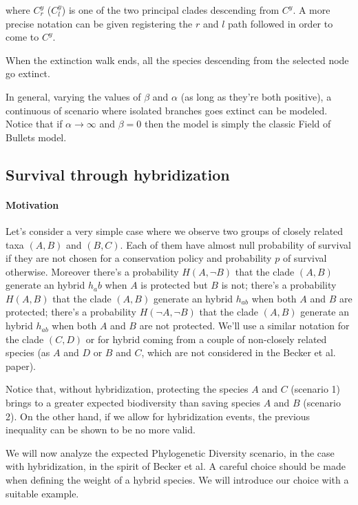 \documentclass[12pt,a4paper]{report}
\begin{document}
where $C^y_r$ ($C^y_l$) is one of the two principal clades descending from $C^y$. A more precise notation can be given registering the $r$ and $l$ path followed in order to come to $C^y$.

When the extinction walk ends, all the species descending from the selected node go extinct.

In general, varying the values of $\beta$ and $\alpha$ (as long as they're both positive), a continuous of scenario where isolated branches goes extinct can be modeled. Notice that if $\alpha \to \infty$ and $\beta = 0$ then the model is simply the classic Field of Bullets model.

\subsection*{Survival through hybridization}

\paragraph{Motivation}

Let's consider a very simple case where we observe two groups of closely related taxa $(A,B)$ and $(B,C)$. Each of them have almost null probability of survival if they are not chosen for a conservation policy and probability $p$ of survival otherwise. Moreover there's a probability $H(A,\neg B)$ that the clade $(A,B)$ generate an hybrid $h_ab$ when $A$ is protected but $B$ is not; there's a probability $H(A,B)$ that the clade $(A,B)$ generate an hybrid $h_{ab}$ when both $A$ and $B$ are protected; there's a probability $H(\neg A, \neg B)$ that the clade $(A,B)$ generate an hybrid $h_{ab}$ when both $A$ and $B$ are not protected. We'll use a similar notation for the clade $(C,D)$ or for hybrid coming from a couple of non-closely related species (as $A$ and $D$ or $B$ and $C$, which are not considered in the Becker et al. paper).

Notice that, without hybridization, protecting the species $A$ and $C$ (scenario 1) brings to a greater expected biodiversity than saving species $A$ and $B$ (scenario 2). On the other hand, if we allow for hybridization events, the previous inequality can be shown to be no more valid.

We will now analyze the expected Phylogenetic Diversity scenario, in the case with hybridization, in the spirit of Becker et al. A careful choice should be made when defining the weight of a hybrid species. We will introduce our choice with a suitable example.
\end{document}
